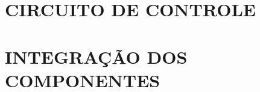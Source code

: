 \section{CIRCUITO DE CONTROLE}
\label{sec:controlCircuit}



\section{INTEGRAÇÃO DOS COMPONENTES}
\label{sec:plant}

